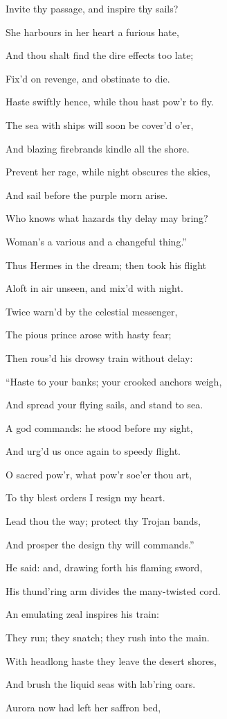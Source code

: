 Invite thy passage, and inspire thy sails?

She harbours in her heart a furious hate,

And thou shalt find the dire effects too late;

Fix’d on revenge, and obstinate to die.

Haste swiftly hence, while thou hast pow’r to fly.

The sea with ships will soon be cover’d o’er,

And blazing firebrands kindle all the shore.

Prevent her rage, while night obscures the skies,

And sail before the purple morn arise.

Who knows what hazards thy delay may bring?

Woman’s a various and a changeful thing.”

Thus Hermes in the dream; then took his flight

Aloft in air unseen, and mix’d with night.

Twice warn’d by the celestial messenger,

The pious prince arose with hasty fear;

Then rous’d his drowsy train without delay:

“Haste to your banks; your crooked anchors weigh,

And spread your flying sails, and stand to sea.

A god commands: he stood before my sight,

And urg’d us once again to speedy flight.

O sacred pow’r, what pow’r soe’er thou art,

To thy blest orders I resign my heart.

Lead thou the way; protect thy Trojan bands,

And prosper the design thy will commands.”

He said: and, drawing forth his flaming sword,

His thund’ring arm divides the many-twisted cord.

An emulating zeal inspires his train:

They run; they snatch; they rush into the main.

With headlong haste they leave the desert shores,

And brush the liquid seas with lab’ring oars.

Aurora now had left her saffron bed,

